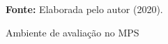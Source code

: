 \begin{figure}[ht!]
\centering

\caption{\textmd{Ambiente de avaliação no \gls{MPS}}}
\label{fig:ambiente}

\par\medskip\textbf{Fonte:} Elaborada pelo autor (2020). \par\medskip

\end{figure}

